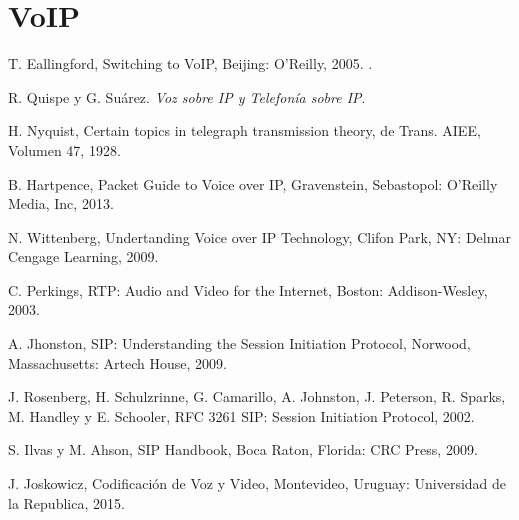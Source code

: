 \documentclass[12pt]{book}
\begin{document}
	
	\chapter{VoIP}
	
	
	
	\begin{thebibliography}{15}
		T. Eallingford, Switching to VoIP, Beijing: O'Reilly, 2005. .
		
		R. Quispe y G. Suárez.	
		\textit{ Voz sobre IP y Telefonía sobre IP}.
		
		H. Nyquist, Certain topics in telegraph transmission theory, de Trans. AIEE, Volumen 47, 1928.
		
		B. Hartpence, Packet Guide to Voice over IP, Gravenstein, Sebastopol: O'Reilly Media, Inc, 2013. 
		
		N. Wittenberg, Undertanding Voice over IP Technology, Clifon Park, NY: Delmar Cengage Learning, 2009.
		
		C. Perkings, RTP: Audio and Video for the Internet, Boston: Addison-Wesley, 2003.
		
		A. Jhonston, SIP: Understanding the Session Initiation Protocol, Norwood, Massachusetts: Artech House, 2009.
		
		J. Rosenberg, H. Schulzrinne, G. Camarillo, A. Johnston, J. Peterson, R. Sparks, M. Handley y E. Schooler, RFC 3261 SIP: Session Initiation Protocol, 2002. 
		
		S. Ilvas y M. Ahson, SIP Handbook, Boca Raton, Florida: CRC Press, 2009.
		
		J. Joskowicz, Codificación de Voz y Video, Montevideo, Uruguay: Universidad de la Republica, 2015.
		
	\end{thebibliography}
\end{document}
